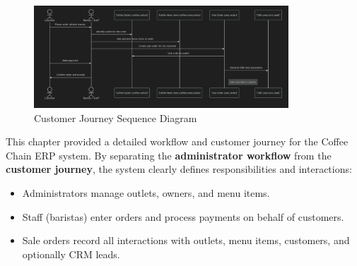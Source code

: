\begin{figure}[H]
    \centering
    \includegraphics[width=0.85\textwidth]{diagrams/customer_journey.png}
    \caption{Customer Journey Sequence Diagram}
\end{figure}


This chapter provided a detailed workflow and customer journey for the Coffee Chain ERP system. By separating the \textbf{administrator workflow} from the \textbf{customer journey}, the system clearly defines responsibilities and interactions:

\begin{itemize}
    \item Administrators manage outlets, owners, and menu items.
    \item Staff (baristas) enter orders and process payments on behalf of customers.
    \item Sale orders record all interactions with outlets, menu items, customers, and optionally CRM leads.
\end{itemize}

